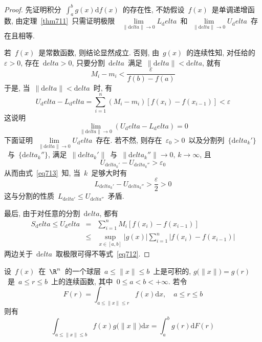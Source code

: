 \begin{proof}
先证明积分~$\int_a^b g(x) \mathrm{d} f(x)$~的存在性, 不妨假设~$f(x)$~是单调递增函数, 由定理~\ref{thm711}~只需证明极限~
$\lim\limits_{\|\mathrm{d}elta\| \to 0} L_\mathrm{d}elta$~和~$\lim\limits_{\|\mathrm{d}elta\| \to 0} U_\mathrm{d}elta$~存在且相等.

若~$f(x)$~是常数函数, 则结论显然成立. 否则, 由~$g(x)$~的连续性知, 对任给的~$\varepsilon > 0$, 存在~$\mathrm{d}elta > 0$, 只要分割~$\mathrm{d}elta$~满足~$\|\mathrm{d}elta\| < \mathrm{d}elta$, 就有
\[
M_i-m_i < \frac{\varepsilon}{f(b)-f(a)}
\]
于是, 当~$\|\mathrm{d}elta\| < \mathrm{d}elta$~时, 有
\[
U_\mathrm{d}elta - L_\mathrm{d}elta = \sum_{i=1}^n (M_i-m_i) [f(x_i)-f(x_{i-1})] < \varepsilon
\]
这说明
\begin{equation} \label{eq713}
\lim_{\|\mathrm{d}elta\| \to 0} (U_\mathrm{d}elta-L_\mathrm{d}elta) = 0
\end{equation}
下面证明~$\lim\limits_{\|\mathrm{d}elta\| \to 0} U_\mathrm{d}elta$~存在. 若不然, 则存在~$\varepsilon_0 > 0$~以及分割列~$\{\mathrm{d}elta_k'\}$~与~$\{\mathrm{d}elta_k''\}$, 满足~$\|\mathrm{d}elta_k'\|$~与~$\|\mathrm{d}elta_k''\| \to 0, \, k \to \infty$, 且
\[
U_{\mathrm{d}elta_k'} - U_{\mathrm{d}elta_k''} > \varepsilon_0
\]
从而由式~\eqref{eq713}~知, 当~$k$~足够大时有
\[
L_{\mathrm{d}elta_k'}-U_{\mathrm{d}elta_k''} > \frac{\varepsilon}{2} > 0
\]
这与分割的性质~$L_{\mathrm{d}elta'} \leqslant U_{\mathrm{d}elta''}$~矛盾.

最后, 由于对任意的分割~$\mathrm{d}elta$, 都有
\begin{eqnarray*}
S_\mathrm{d}elta \leqslant U_\mathrm{d}elta &=& \sum_{i=1}^n M_i [f(x_i)-f(x_{i-1})] \\
&\leqslant& \sup_{x \in [a,b]} \big| g(x) \big| \sum_{i=1}^n \big|f(x_i)-f(x_{i-1})\big|
\end{eqnarray*}
两边关于~$\mathrm{d}elta$~取极限可得不等式~\eqref{eq712}.
\end{proof}

\begin{Example}
设~$f(x)$~在~$\R^n$~的一个球层~$a \leqslant \|x\| \leqslant b$~上是可积的, $g\big(\|x\|\big)=g(r)$~是~$a \leqslant r \leqslant b$~上的连续函数, 其中~$0 \leqslant a < b < +\infty$. 若令
\[
F(r)=\int_{a\leqslant \|x\| \leqslant r} f(x) \mathrm{d} x, \quad a \leqslant r \leqslant b
\]
则有
\[
\int_{a \leqslant \|x\| \leqslant b} f(x) g\big(\|x\|\big) \mathrm{d} x = \int_a^b g(r) \mathrm{d} F(r)
\]
\end{Example}

